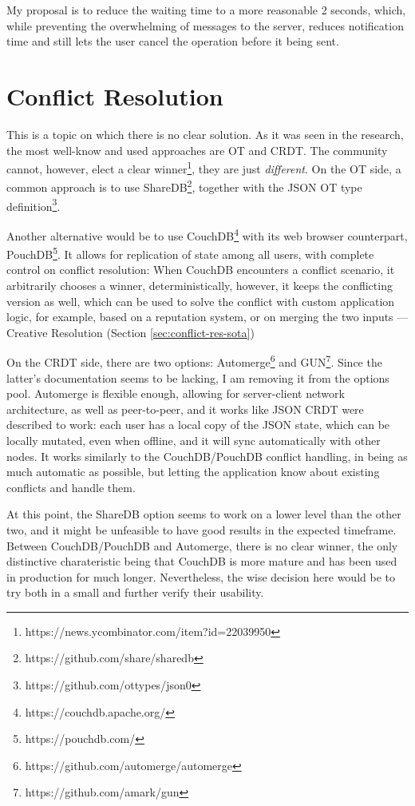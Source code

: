 My proposal is to reduce the waiting time to a more reasonable 2 seconds, which, while preventing the overwhelming of messages to the server, reduces notification time and still lets the user cancel the operation before it being sent.

\section{Conflict Resolution} \label{sec:prob-solution-conflict-res}
This is a topic on which there is no clear solution. As it was seen in the research, the most well-know and used approaches are OT and CRDT. The community cannot, however, elect a clear winner\footnote{https://news.ycombinator.com/item?id=22039950}, they are just \textit{different}. On the OT side, a common approach is to use ShareDB\footnote{https://github.com/share/sharedb}, together with the JSON OT type definition\footnote{https://github.com/ottypes/json0}.

Another alternative would be to use CouchDB\footnote{https://couchdb.apache.org/} with its web browser counterpart, PouchDB\footnote{https://pouchdb.com/}. It allows for replication of state among all users, with complete control on conflict resolution: When CouchDB encounters a conflict scenario, it arbitrarily chooses a winner, deterministically, however, it keeps the conflicting version as well, which can be used to solve the conflict with custom application logic, for example, based on a reputation system, or on merging the two inputs --- Creative Resolution (Section \ref{sec:conflict-res-sota})

On the CRDT side, there are two options: Automerge\footnote{https://github.com/automerge/automerge} and GUN\footnote{https://github.com/amark/gun}. Since the latter's documentation seems to be lacking, I am removing it from the options pool. Automerge is flexible enough, allowing for server-client network architecture, as well as peer-to-peer, and it works like JSON CRDT were described to work: each user has a local copy of the JSON state, which can be locally mutated, even when offline, and it will sync automatically with other nodes. It works similarly to the CouchDB/PouchDB conflict handling, in being as much automatic as possible, but letting the application know about existing conflicts and handle them.

At this point, the ShareDB option seems to work on a lower level than the other two, and it might be unfeasible to have good results in the expected timeframe. Between CouchDB/PouchDB and Automerge, there is no clear winner, the only distinctive charateristic being that CouchDB is more mature and has been used in production for much longer. Nevertheless, the wise decision here would be to try both in a small  and further verify their usability. 

